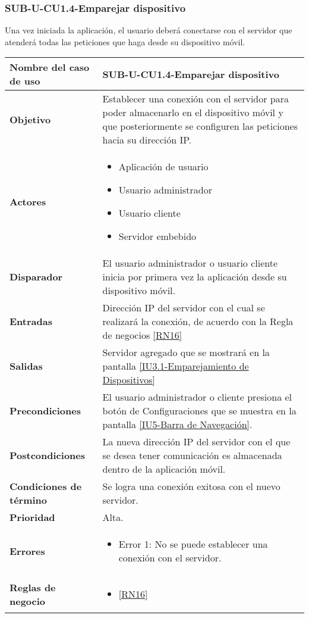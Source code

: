 \subsubsection{SUB-U-CU1.4-Emparejar dispositivo}\label{SUB-U-CU1.4}
Una vez iniciada la aplicación, el usuario deberá conectarse con el servidor que atenderá todas las peticiones que haga desde su dispositivo móvil.
\begin{longtable}{|J{5cm}|J{10.3cm}|}
	\hline
	\textbf{Nombre del caso de uso} &
		SUB-U-CU1.4-Emparejar dispositivo \\ \hline
	\textbf{Objetivo} &
		Establecer una conexión con el servidor para poder almacenarlo en el dispositivo móvil y que posteriormente se configuren las peticiones hacia su dirección IP. \\ \hline
	\textbf{Actores} &
	    \begin{itemize}
			\item Aplicación de usuario
			\item Usuario administrador
			\item Usuario cliente
		    \item Servidor embebido
		\end{itemize}\\ \hline 
	\textbf{Disparador} & 
		El usuario administrador o usuario cliente inicia por primera vez la aplicación desde su dispositivo móvil. \\ \hline 
	\textbf{Entradas} & 
		Dirección IP del servidor con el cual se realizará la conexión, de acuerdo con la Regla de negocios \ref{RN16}\\ \hline 
	\textbf{Salidas} & 
		Servidor agregado que se mostrará en la pantalla \hyperref[fig:Emparejamiento Dispositivos]{[IU3.1-Emparejamiento de Dispositivos]} \\ \hline
	\textbf{Precondiciones} &
		El usuario administrador o cliente presiona el botón de Configuraciones que se muestra en la pantalla \hyperref[fig:Barra de navegacion]{[IU5-Barra de Navegación]}.\\ \hline 
	\textbf{Postcondiciones} &
		La nueva dirección IP del servidor con el que se desea tener comunicación es almacenada dentro de la aplicación móvil.\\ \hline 
	\textbf{Condiciones de término} & 
		Se logra una conexión exitosa con el nuevo servidor. \\ \hline
	\textbf{Prioridad} & 
		Alta. \\ \hline
	\textbf{Errores} & 
		\begin{itemize}
			\item \label{SUB-U-CU1.4:Error1} Error 1: No se puede establecer una conexión con el servidor.
		\end{itemize} \\ \hline
	\textbf{Reglas de negocio} & 
	    \begin{itemize}
		    \item \ref{RN16}
		\end{itemize} \\ \hline
\end{longtable}


